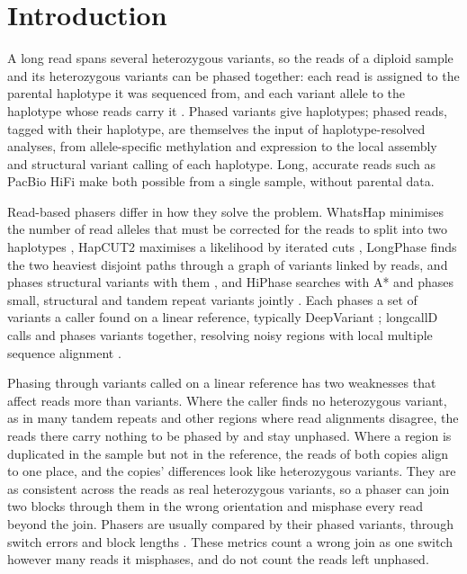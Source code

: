 \section{Introduction}

A long read spans several heterozygous variants, so the reads of a diploid sample and its heterozygous variants can be phased together: each read is assigned to the parental haplotype it was sequenced from, and each variant allele to the haplotype whose reads carry it \citep{Patterson2015,Edge2017}. Phased variants give haplotypes; phased reads, tagged with their haplotype, are themselves the input of haplotype-resolved analyses, from allele-specific methylation and expression to the local assembly and structural variant calling of each haplotype. Long, accurate reads such as PacBio HiFi \citep{Wenger2019} make both possible from a single sample, without parental data.

Read-based phasers differ in how they solve the problem. WhatsHap minimises the number of read alleles that must be corrected for the reads to split into two haplotypes \citep{Patterson2015,Martin2016}, HapCUT2 maximises a likelihood by iterated cuts \citep{Edge2017}, LongPhase finds the two heaviest disjoint paths through a graph of variants linked by reads, and phases structural variants with them \citep{Lin2022}, and HiPhase searches with A* and phases small, structural and tandem repeat variants jointly \citep{Holt2024}. Each phases a set of variants a caller found on a linear reference, typically DeepVariant \citep{Poplin2018,Shafin2021}; longcallD calls and phases variants together, resolving noisy regions with local multiple sequence alignment \citep{Gao2026}.

Phasing through variants called on a linear reference has two weaknesses that affect reads more than variants. Where the caller finds no heterozygous variant, as in many tandem repeats and other regions where read alignments disagree, the reads there carry nothing to be phased by and stay unphased. Where a region is duplicated in the sample but not in the reference, the reads of both copies align to one place, and the copies' differences look like heterozygous variants. They are as consistent across the reads as real heterozygous variants, so a phaser can join two blocks through them in the wrong orientation and misphase every read beyond the join. Phasers are usually compared by their phased variants, through switch errors and block lengths \citep{Lin2022,Holt2024}. These metrics count a wrong join as one switch however many reads it misphases, and do not count the reads left unphased.

